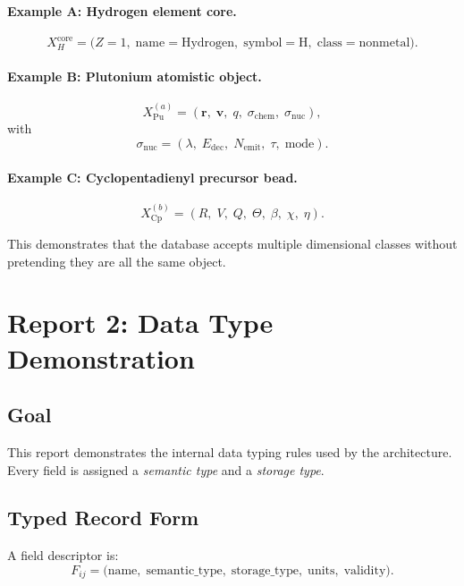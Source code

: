 \documentclass[11pt, a4paper, oneside]{article}
\begin{document}
\paragraph{Example A: Hydrogen element core.}
\[
X_H^{\text{core}} = \bigl(Z{=}1,\;\text{name}{=}\text{Hydrogen},\;
  \text{symbol}{=}\text{H},\;\text{class}{=}\text{nonmetal}\bigr).
\]

\paragraph{Example B: Plutonium atomistic object.}
\[
X_{\text{Pu}}^{(a)} = (\bm{r},\;\bm{v},\;q,\;\sigma_{\text{chem}},\;\sigma_{\text{nuc}}),
\]
with
\[
\sigma_{\text{nuc}} = (\lambda,\;E_{\text{dec}},\;N_{\text{emit}},\;\tau,\;\text{mode}).
\]

\paragraph{Example C: Cyclopentadienyl precursor bead.}
\[
X_{\text{Cp}}^{(b)} = (R,\;V,\;Q,\;\Theta,\;\beta,\;\chi,\;\eta).
\]

This demonstrates that the database accepts multiple dimensional classes without
pretending they are all the same object.


\section{Report 2: Data Type Demonstration}
\label{sec:report2}

\subsection{Goal}

This report demonstrates the internal data typing rules used by the
architecture.  Every field is assigned a \emph{semantic type} and a
\emph{storage type}.

\subsection{Typed Record Form}

A field descriptor is:
\begin{equation}
\label{eq:field_desc}
F_{ij} = \bigl(\text{name},\;\text{semantic\_type},\;\text{storage\_type},\;
               \text{units},\;\text{validity}\bigr).
\end{equation}
\end{document}
